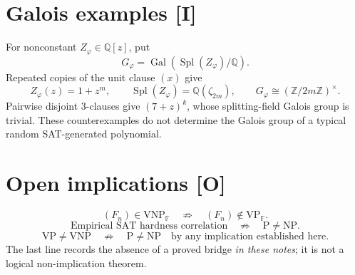 \documentclass[11pt]{article}
\newcommand{\VNP}{\mathrm{VNP}}
\newcommand{\VP}{\mathrm{VP}}
\newcommand{\F}{\mathbb{F}}
\DeclareMathOperator{\Gal}{Gal}
\DeclareMathOperator{\Spl}{Spl}
\begin{document}
\section{Galois examples [I]}
For nonconstant $Z_\varphi\in\mathbb{Q}[z]$, put
\[
G_\varphi=\Gal(\Spl(Z_\varphi)/\mathbb Q).
\]
Repeated copies of the unit clause $(x)$ give
\[
Z_\varphi(z)=1+z^m,\qquad
\Spl(Z_\varphi)=\mathbb Q(\zeta_{2m}),\qquad
G_\varphi\cong(\mathbb Z/2m\mathbb Z)^\times.
\]
Pairwise disjoint 3-clauses give $(7+z)^k$,
whose splitting-field Galois group is trivial.
These counterexamples do not determine the Galois group
of a typical random SAT-generated polynomial.

\section{Open implications [O]}
\[
(F_n)\in\VNP_{\F}
\quad\not\Rightarrow\quad
(F_n)\notin\VP_{\F}.
\]
\[
\text{Empirical SAT hardness correlation}
\quad\not\Rightarrow\quad
\mathrm{P}\ne\mathrm{NP}.
\]
\[
\VP\ne\VNP
\quad\not\Rightarrow\quad
\mathrm{P}\ne\mathrm{NP}
\quad\text{by any implication established here}.
\]
The last line records the absence of a proved bridge
\emph{in these notes}; it is not a logical non-implication theorem.
\end{document}
